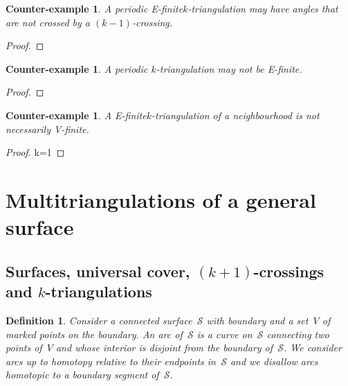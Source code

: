 \documentclass{amsart}
\newtheorem{ce}[theorem]{Counter-example}
\newtheorem{definition}[theorem]{Definition}
\theoremstyle{remark}
\newtheorem{remark}{Remark}[section]
\newcommand{\darkblue}{\color{darkblue}} %
\newcommand{\defn}[1]{\textsl{\darkblue #1}} %
\newcommand*{\nbd}[0]{neighbourhood\xspace}
\newcommand*{\ef}[0]{E-finite\xspace}
\newcommand*{\vf}[0]{V-finite\xspace}
\newcommand*{\ktg}[0]{$k$-triangulation\xspace}
\newcommand{\surface}{\mathcal{S}}
\begin{document}
\begin{ce}
A periodic \ef \ktg may have angles that are not crossed by a $(k-1)$-crossing.
\end{ce}
\begin{proof}

\end{proof}

\begin{ce} 
A periodic \ktg may not be \ef.
\end{ce}
\begin{proof}

\end{proof}

\begin{ce}
A \ef \ktg of a \nbd is not necessarily \vf.
\end{ce}
\begin{proof}
k=1
\end{proof}


\section{Multitriangulations of a general surface}


\subsection{Surfaces, universal cover, $(k+1)$-crossings and $k$-triangulations}

\begin{definition}
Consider a connected surface~$\surface$ with boundary and a set~$V$ of marked points on the boundary. An \defn{arc} of~$\surface$ is a curve on~$\surface$ connecting two points of~$V$ and whose interior is disjoint from the boundary of~$\surface$. We consider arcs up to homotopy relative to their endpoints in~$\surface$ and we disallow arcs homotopic to a boundary segment of~$\surface$.
\end{definition}

\end{document}
